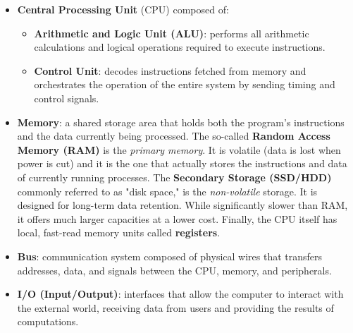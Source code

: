 \begin{itemize}
    \item \textbf{Central Processing Unit} (CPU) composed of:
    \begin{itemize}
    \item \textbf{Arithmetic and Logic Unit (ALU)}: performs all arithmetic calculations and logical operations required to execute instructions.
    \item \textbf{Control Unit}: decodes instructions fetched from memory and orchestrates the operation of the entire system by sending timing and control signals.
    \end{itemize}
    \item \textbf{Memory}: a shared storage area that holds both the program's instructions and the data currently being processed. The so-called \textbf{Random Access Memory (RAM)} is the \textit{primary memory}. It is volatile (data is lost when power is cut) and it is the one that actually stores the instructions and data of currently running processes. The \textbf{Secondary Storage (SSD/HDD)} commonly referred to as "disk space,"  is the \textit{non-volatile} storage. It is designed for long-term data retention. While significantly slower than RAM, it offers much larger capacities at a lower cost. Finally, the CPU itself has local, fast-read memory units called \textbf{registers}. 
    \item \textbf{Bus}: communication system composed of physical wires that transfers addresses, data, and signals between the CPU, memory, and peripherals.
    \item \textbf{I/O (Input/Output)}: interfaces that allow the computer to interact with the external world, receiving data from users and providing the results of computations.
\end{itemize}

